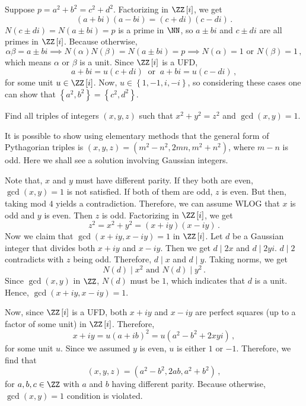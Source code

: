 \documentclass[11pt]{scrartcl}
\begin{document}
\begin{soln}
Suppose \(p = a^2+b^2=c^2+d^2\). Factorizing in \(\ZZ \left[i\right] \), we get
\[ \left(a+bi\right)\left(a-bi\right) = \left(c+di\right) \left(c-di\right) \,. \]
\(N \left(c \pm di\right) = N \left(a\pm bi\right)  = p\) is a prime in \(\NN\), so \(a \pm bi\) and \(c \pm di \) are all primes in \(\ZZ \left[i\right] \). Because otherwise,
\[ \alpha \beta = a \pm bi \implies N \left(\alpha\right) N \left(\beta\right) = N \left(a \pm bi\right) = p \implies N \left(\alpha\right) = 1 \text{ or } N \left(\beta \right) = 1 \,, \]
which means \(\alpha\) or \(\beta\) is a unit. Since \(\ZZ \left[i\right] \) is a UFD,
\[ a + bi = u \left(c+di\right) \ \text{ or } \ a+bi = u \left(c-di\right) \,, \]
for some unit \(u \in \ZZ \left[i\right] \). Now, \(u \in \left\{1,-1,i, -i\right\} \), so considering these cases one can show that \(\left\{a^2, b^2\right\} = \left\{c^2,d^2\right\} \).
\end{soln}
\begin{exercise}
Find all triples of integers \(\left(x,y,z\right) \) such that \(x^2 + y^2 = z^2\) and \(\gcd \left(x,y\right) = 1\).
\end{exercise}
It is possible to show using elementary methods that the general form of Pythagorian triples is \(\left(x,y,z\right) = \left(m^2-n^2, 2mn, m^2 +n^2\right) \), where \(m-n\) is odd. Here we shall see a solution involving Gaussian integers.
\begin{soln}
Note that, \(x\) and \(y\) must have different parity. If they both are even, \(\gcd \left(x,y\right) = 1\) is not satisfied. If both of them are odd, \(z\) is even. But then, taking mod \(4\) yields a contradiction. Therefore, we can assume WLOG that \(x\) is odd and \(y\) is even. Then \(z\) is odd. Factorizing in \(\ZZ \left[i\right] \), we get
\[ z^2 = x^2+y^2 = \left(x+iy\right) \left(x-iy\right) \,. \]
Now we claim that \(\gcd \left(x+iy, x-iy\right) = 1\) in \(\ZZ \left[i\right] \). Let \(d\) be a Gaussian integer that divides both \(x+iy\) and \(x-iy\). Then we get \(d \mid 2x\) and \(d \mid 2yi\). \(d \mid 2\) contradicts with \(z\) being odd. Therefore, \(d \mid x\) and \(d \mid y\). Taking norms, we get
\[ N \left(d\right) \mid x^2 \text{ and } N \left(d\right) \mid y^2 \,. \]
Since \(\gcd \left(x,y\right) \) in \(\ZZ\), \(N \left(d\right) \) must be \(1\), which indicates that \(d\) is a unit. Hence, \(\gcd \left(x+iy, x-iy\right) = 1\).

Now, since \(\ZZ \left[i\right] \) is a UFD, both \(x+iy\) and \(x-iy\) are perfect squares (up to a factor of some unit) in \(\ZZ \left[i\right] \). Therefore,
\[ x+iy = u \left(a+ib\right) ^2 = u \left( a^2 - b^2 + 2xyi\right) \, ,   \]
for some unit \(u\). Since we assumed \(y\) is even, \(u\) is either \(1\) or \(-1\). Therefore, we find that
\[ \left(x,y,z\right) = \left(a^2 - b^2, 2ab, a^2 + b^2\right) \,, \]
for \(a,b,c \in \ZZ\) with \(a\) and \(b\) having different parity. Because otherwise, \(\gcd \left(x,y\right)  = 1 \) condition is violated.
\end{soln}
\end{document}
